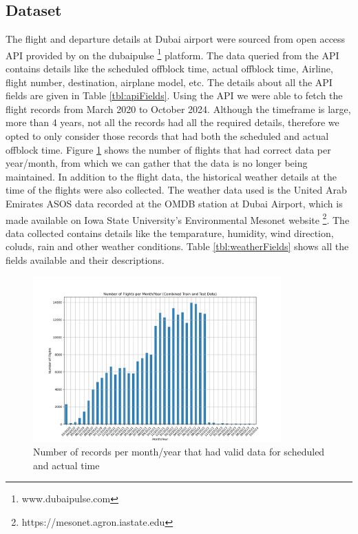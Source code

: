 \documentclass[twoside,11pt]{article}
\begin{document}
\subsection{Dataset}
The flight and departure details at Dubai airport were sourced from open access API provided by \cite{dubaiairportsDatasetDa_flight_information_departuresopenapi} on the dubaipulse \footnote{www.dubaipulse.com} platform. The data queried from the API contains details like the scheduled offblock time, actual offblock time, Airline, flight number, destination, airplane model, etc. The details about all the API fields are given in Table \ref{tbl:apiFields}. Using the API we were able to fetch the flight records from March 2020 to October 2024. Although the timeframe is large, more than 4 years, not all the records had all the required details, therefore we opted to only consider those records that had both the scheduled and actual offblock time. Figure \ref{fig:flightsYearMonth} shows the number of flights that had correct data per year/month, from which we can gather that the data is no longer being maintained. 
In addition to the flight data, the historical weather details at the time of the flights were also collected. The weather data used is the United Arab Emirates ASOS data recorded at the OMDB station at Dubai Airport, which is made available on Iowa State University's Environmental Mesonet website \footnote{https://mesonet.agron.iastate.edu}. The data collected contains details like the temparature, humidity, wind direction, coluds, rain and other weather conditions. Table \ref{tbl:weatherFields} shows all the fields available and their descriptions. 
\begin{figure}
  \centering
  \includegraphics[width=0.85\textwidth]{images/flights_per_month_year.png}
  \caption{Number of records per month/year that had valid data for scheduled and actual time}
  \label{fig:flightsYearMonth}
\end{figure}
\end{document}
